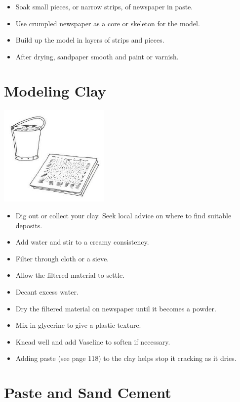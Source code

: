 \begin{multicols}{2}
\begin{itemize}
\item Soak small pieces, or narrow
strips, of newspaper in paste.
\item Use crumpled newspaper as a
core or skeleton for the model.
\item Build up the model in layers of
strips and pieces.
\item After drying, sandpaper smooth
and paint or varnish.
\end{itemize}


\section{Modeling Clay}

\begin{center}
\includegraphics[width=0.4\textwidth]{./img/vso/modeling-clay.jpg}
\end{center}

\begin{itemize}
\item Dig out or collect your clay. Seek local advice on where to find
suitable deposits.
\item Add water and stir to a creamy consistency.
\item Filter through cloth or a sieve.
\item Allow the filtered material to settle.
\item Decant excess water.
\item Dry the filtered material on newspaper until it becomes a powder.
\item Mix in glycerine to give a plastic texture.
\item Knead well and add Vaseline to soften if necessary.
\item Adding paste (see page 118) to the clay helps stop it cracking as it
dries.
\end{itemize}


\section{Paste and Sand Cement} 


\end{multicols}

